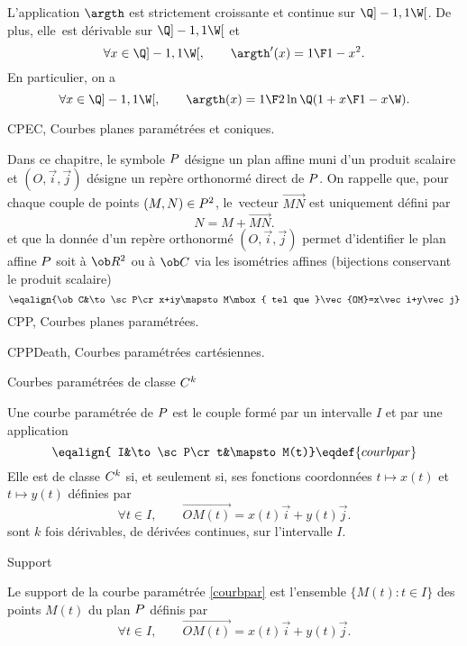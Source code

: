 \Propriete []  L'application $\argth$ est strictement croissante et continue sur $\Q]-1,1\W[$. 
De plus, elle~est d\'erivable sur $\Q]-1,1\W[$ et 
$$
\forall x\in\Q]-1,1\W[ ,\qquad  \argth'(x)={1\F1-x^2 }. 
$$
En particulier, on a 
$$
\forall x\in\Q]-1,1\W[,\qquad\argth(x)={1\F2}\ln\Q({1+x\F1-x}\W). 
$$
























\Chapter CPEC, Courbes planes param\'etr\'ees et coniques.
\bigskip

\noindent
Dans ce chapitre, le symbole $\sc P$ d\'esigne un plan affine muni d'un produit scalaire 
et $(O,\vec i,\vec j)$ d\'esigne un rep\`ere orthonorm\'e direct de $\sc P$. 
\bigskip
\noindent
On rappelle que, pour chaque couple de points $(M,N)\in\sc P^2$, le~vecteur $\vec{MN}$ est uniquement d\'efini par 
$$
N=M+\vec{MN}.
$$
et que la donn\'ee d'un rep\`ere orthonorm\'e $(O,\vec i,\vec j)$ permet d'identifier le plan affine $\sc P$ soit \`a $\ob R^2$ ou \`a $\ob C$ via les isom\'etries affines (bijections conservant le produit scalaire)
$$
\eqalign{\ob C&\to\sc P\cr x+iy\mapsto  M\mbox{ tel que }\vec{OM}=x\vec i+y\vec j}
$$
\bigskip
\Section CPP, Courbes planes param\'etr\'ees.

\Subsection CPPDeath, Courbes param\'etr\'ees cart\'esiennes.

\Concept [] Courbes param\'etr\'ees de classe $\sc C^k$

\noindent
Une courbe param\'etr\'ee de $\sc P$ est le couple form\'e par un intervalle $I$ et par une application 
$$
\eqalign{ I&\to\sc P\cr t&\mapsto  M(t)}\eqdef{courbpar}
$$ 
Elle est de classe $\sc C^k$ si, et seulement si, ses fonctions coordonn\'ees $t\mapsto x(t)$ et $t\mapsto y(t)$ d\'efinies par 
$$
\forall t\in I, \qquad \vec {OM(t)}=x(t)\vec i+y(t)\vec j. 
$$
sont $k$ fois d\'erivables, de d\'eriv\'ees continues, sur l'intervalle $I$. 
\bigskip

\Concept [] Support

\noindent
Le support de la courbe param\'etr\'ee \eqref{courbpar} est l'ensemble $\{M(t):t\in I\}$ des points $M(t)$ du plan $\sc P$ d\'efinis par  
$$
\forall t\in I, \qquad \vec {OM(t)}=x(t)\vec i+y(t)\vec j. 
$$

